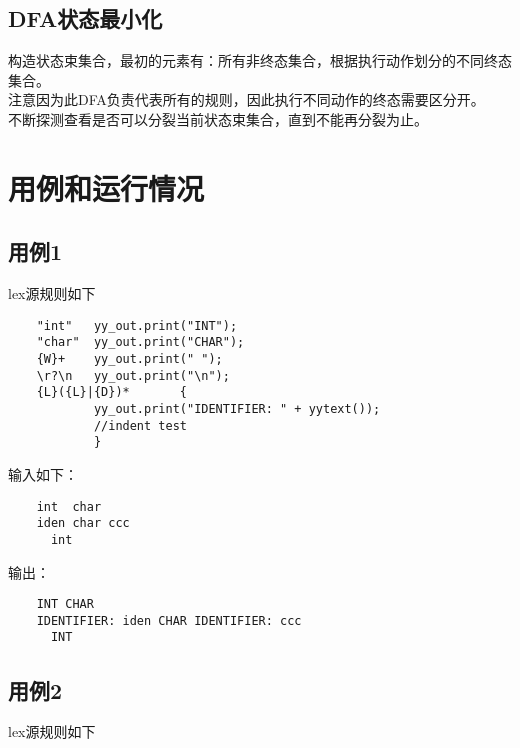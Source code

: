 \documentclass[a4paper]{ctexart} %
\begin{document}
	\subsection{DFA状态最小化}
	构造状态束集合，最初的元素有：所有非终态集合，根据执行动作划分的不同终态集合。\\
	注意因为此DFA负责代表所有的规则，因此执行不同动作的终态需要区分开。\\
	不断探测查看是否可以分裂当前状态束集合，直到不能再分裂为止。

	\section{用例和运行情况}
	\subsection{用例1}
	lex源规则如下

	\begin{verbatim}
	"int" 	yy_out.print("INT"); 
	"char" 	yy_out.print("CHAR");
	{W}+	yy_out.print(" ");
	\r?\n	yy_out.print("\n");
	{L}({L}|{D})*		{ 
			yy_out.print("IDENTIFIER: " + yytext());
			//indent test
			}
	\end{verbatim}

	输入如下：
	\begin{verbatim}
	int  char  
	iden char ccc
	  int  
	\end{verbatim}

	输出：
	\begin{verbatim}
	INT CHAR 
	IDENTIFIER: iden CHAR IDENTIFIER: ccc
	  INT
	\end{verbatim}

	\subsection{用例2}

	lex源规则如下
\end{document}
